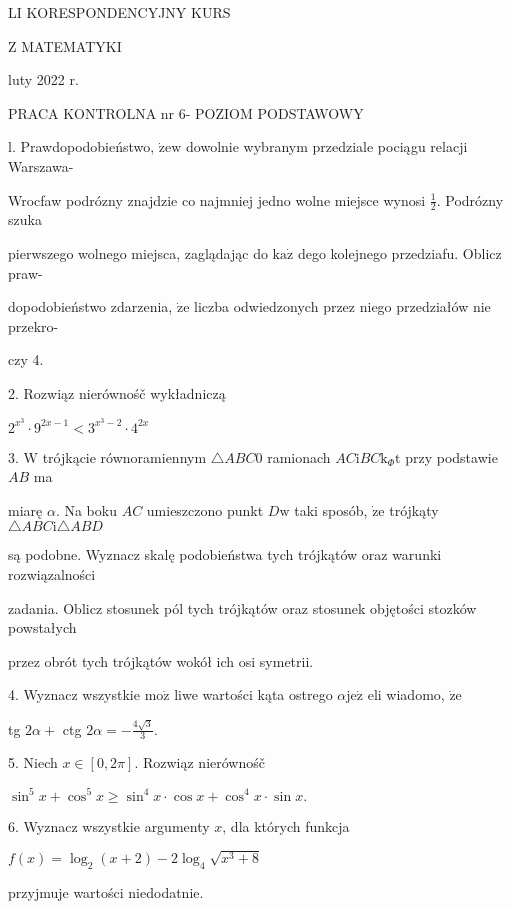 \documentclass[a4paper,12pt]{article}
\begin{document}
LI KORESPONDENCYJNY KURS

Z MATEMATYKI

luty 2022 r.

PRACA KONTROLNA nr 6- POZIOM PODSTAWOWY

l. Prawdopodobieństwo, $\dot{\mathrm{z}}\mathrm{e}\mathrm{w}$ dowolnie wybranym przedziale pociągu relacji Warszawa-

Wrocfaw podrózny znajdzie co najmniej jedno wolne miejsce wynosi $\displaystyle \frac{1}{2}$. Podrózny szuka

pierwszego wolnego miejsca, zaglądając do $\mathrm{k}\mathrm{a}\dot{\mathrm{z}}$ dego kolejnego przedziafu. Oblicz praw-

dopodobieństwo zdarzenia, $\dot{\mathrm{z}}\mathrm{e}$ liczba odwiedzonych przez niego przedziałów nie przekro-

czy 4.

2. Rozwiąz nierównośč wykładniczą

$2^{x^{3}}\cdot 9^{2x-1}<3^{x^{3}-2}\cdot 4^{2x}$

3. $\mathrm{W}$ trójkącie równoramiennym $\triangle ABC0$ ramionach $AC\mathrm{i}BC\mathrm{k}_{\Phi}\mathrm{t}$ przy podstawie $AB$ ma

miarę $\alpha$. Na boku $AC$ umieszczono punkt $D\mathrm{w}$ taki sposób, $\dot{\mathrm{z}}\mathrm{e}$ trójkąty $\triangle ABC\mathrm{i}\triangle ABD$

są podobne. Wyznacz skalę podobieństwa tych trójkątów oraz warunki rozwiązalności

zadania. Oblicz stosunek pól tych trójkątów oraz stosunek objętości stozków powstałych

przez obrót tych trójkątów wokół ich osi symetrii.

4. Wyznacz wszystkie $\mathrm{m}\mathrm{o}\dot{\mathrm{z}}$ liwe wartości kąta ostrego $\alpha \mathrm{j}\mathrm{e}\dot{\mathrm{z}}$ eli wiadomo, $\dot{\mathrm{z}}\mathrm{e}$

tg $2\alpha+$ ctg $2\displaystyle \alpha=-\frac{4\sqrt{3}}{3}.$

5. Niech $x\in[0,2\pi]$. Rozwiąz nierównośč

$\sin^{5}x+\cos^{5}x\geq\sin^{4}x\cdot\cos x+\cos^{4}x\cdot\sin x.$

6. Wyznacz wszystkie argumenty $x$, dla których funkcja

$f(x)=\log_{2}(x+2)-2\log_{4}\sqrt{x^{3}+8}$

przyjmuje wartości niedodatnie.
\end{document}
